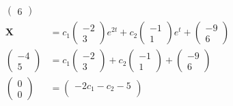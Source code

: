 \documentclass{article}
\begin{document}
\begin{align*}
\begin{pmatrix}
                        6
                      \end{pmatrix}                                                     \\
  \mathbf{X}      & = c_1 \begin{pmatrix}
                            -2 \\
                            3
                          \end{pmatrix} e^{2 t} + c_2 \begin{pmatrix}
                                                        -1 \\
                                                        1
                                                      \end{pmatrix} e^t + \begin{pmatrix}
                                                                            -9 \\
                                                                            6
                                                                          \end{pmatrix} \\
  \begin{pmatrix}
    -4 \\
    5
  \end{pmatrix} & = c_1 \begin{pmatrix}
                          -2 \\
                          3
                        \end{pmatrix} + c_2 \begin{pmatrix}
                                              -1 \\
                                              1
                                            \end{pmatrix} + \begin{pmatrix}
                                                              -9 \\
                                                              6
                                                            \end{pmatrix}               \\
  \begin{pmatrix}
    0 \\
    0
  \end{pmatrix} & = \begin{pmatrix}
                      -2 c_1 - c_2 - 5 \\

\end{pmatrix}
\end{align*}
\end{document}
